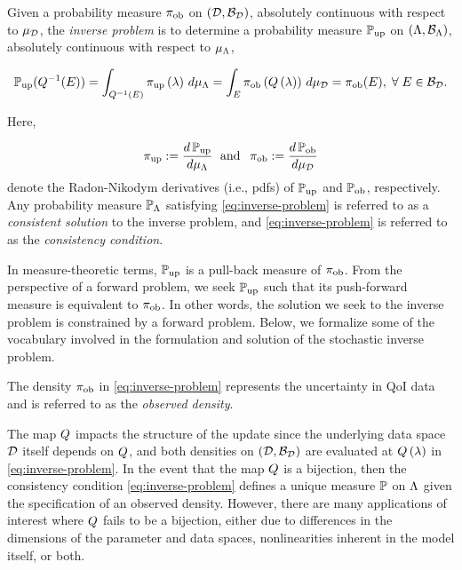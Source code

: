 \begin{defn}\label{defn:inverse-problem}
Given a probability measure $\operatorname*{\pi_{ob}}$ on $(\mathcal{D}, \mathcal{B}_{\mathcal{D}})$, absolutely continuous with respect to $\mu_{\mathcal{D}}$, the \emph{inverse problem} is to determine a probability measure $\operatorname*{\mathbb{P}_{up}}$ on $({\Lambda}, \mathcal{B}_{{\Lambda}})$, absolutely continuous with respect to $\mu_{{\Lambda}}$, 

\begin{equation}\label{eq:inverse-problem}
\operatorname*{\mathbb{P}_{up}}(Q^{-1}(E)) = \int_{Q^{-1}(E)} \operatorname*{\pi_{up}} \left ( \lambda \right ) \, d\mu_{{\Lambda}} = \int_E \operatorname*{\pi_{ob}} \left ( Q\left ( \lambda \right ) \right ) \, d\mu_{\mathcal{D}} = \operatorname*{\pi_{ob}}(E), \; \forall \; E \in \mathcal{B}_{\mathcal{D}}.
\end{equation} 

\noindent Here,
 
\begin{equation*}
\operatorname*{\pi_{up}} := \frac{d\operatorname*{\mathbb{P}_{up}}}{d\mu_{{\Lambda}}} \;\text{ and }\; \operatorname*{\pi_{ob}} := \frac{d\operatorname*{\mathbb{P}_{ob}}}{d\mu_{\mathcal{D}}}
\end{equation*}
denote the Radon-Nikodym derivatives (i.e., pdfs) of $\operatorname*{\mathbb{P}_{up}}$ and $\operatorname*{\mathbb{P}_{ob}}$, respectively. 
Any probability measure $\mathbb{P}_{\Lambda}$ satisfying \eqref{eq:inverse-problem} is referred to as a \emph{consistent solution} to the inverse problem, and \eqref{eq:inverse-problem} is referred to as the \emph{consistency condition}.
\end{defn}

In measure-theoretic terms, $\operatorname*{\mathbb{P}_{up}}$ is a pull-back measure of $\operatorname*{\pi_{ob}}$.
From the perspective of a forward problem, we seek $\operatorname*{\mathbb{P}_{up}}$ such that its push-forward measure is equivalent to $\operatorname*{\pi_{ob}}$. 
In other words, the solution we seek to the inverse problem is constrained by a forward problem. 
Below, we formalize some of the vocabulary involved in the formulation and solution of the stochastic inverse problem.

\begin{defn}\label{defn:obsden}
The density $\operatorname*{\pi_{ob}}$ in \eqref{eq:inverse-problem} represents the uncertainty in QoI data and is referred to as the \emph{observed density}.
\end{defn}

The map $Q$ impacts the structure of the update since the underlying data space $\mathcal{D}$ itself depends on $Q$, and both densities on $(\mathcal{D}, \mathcal{B}_{\mathcal{D}})$ are evaluated at $Q\left ( \lambda \right )$ in \eqref{eq:inverse-problem}.
In the event that the map $Q$ is a bijection, then the consistency condition \eqref{eq:inverse-problem} defines a unique measure $\mathbb{P}$ on ${\Lambda}$ given the specification of an observed density.
However, there are many applications of interest where $Q$ fails to be a bijection, either due to differences in the dimensions of the parameter and data spaces, nonlinearities inherent in the model itself, or both. 


